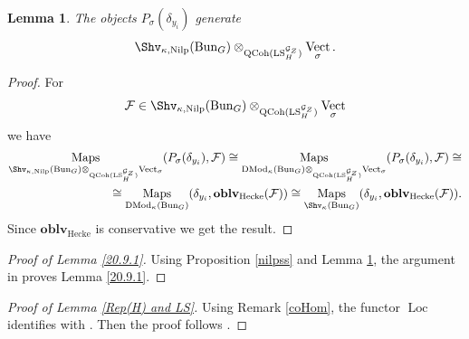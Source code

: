 \documentclass[9pt]{amsart}
\newcommand{\cF}{{\mathcal F}}
\newcommand{\cG}{{\mathcal G}}
\DeclareMathOperator{\QCoh}{{QCoh}}
\DeclareMathOperator{\Maps}{{Maps}}
\DeclareMathOperator{\LocSys}{{LS}}
\DeclareMathOperator{\Loc}{{Loc}}
\DeclareMathOperator{\Nilp}{{Nilp}} \DeclareMathOperator{\op}{{op}}
\DeclareMathOperator{\Vect}{{Vect}}
\newtheorem{lm}[subsubsection]{Lemma}
\numberwithin{equation}{section}
\DeclareMathOperator{\D}{{DMod}}
\begin{document}
\begin{lm}\label{gen}
	The objects $P_{\sigma}(\delta_{y_i})$ generate $$\Shv_{\kappa, \Nilp}(\Bun_G) \otimes_{\QCoh(\LocSys_H^{\cG_Z})} \Vect_{\sigma}.$$
\end{lm}
\begin{proof}
	For $$\cF \in \Shv_{\kappa, \Nilp}(\Bun_G) \otimes_{\QCoh(\LocSys_H^{\cG_Z})} \Vect_{\sigma}$$ we have 
	\begin{equation}
		\begin{split}
		\Maps_{ \Shv_{\kappa, \Nilp}(\Bun_G) \otimes_{\QCoh(\LocSys_H^{\cG_Z})} \Vect_{\sigma}}(P_{\sigma}(\delta_{y_i}), \cF) \cong \Maps_{ \D_{\kappa}(\Bun_G) \otimes_{\QCoh(\LocSys_H^{\cG_Z})} \Vect_{\sigma}}(P_{\sigma}(\delta_{y_i}), \cF) \cong \\
		\cong  \Maps_{\D_{\kappa}(\Bun_G)}(\delta_{y_i}, \mathbf{oblv}_{\operatorname{Hecke}}(\cF)) \cong \Maps_{\Shv_{\kappa}(\Bun_G)}(\delta_{y_i}, \mathbf{oblv}_{\operatorname{Hecke}}(\cF)).
		\end{split}
	\end{equation}
	Since $\mathbf{oblv}_{\operatorname{Hecke}}$ is conservative we get the result.
\end{proof}


\begin{proof}[Proof of Lemma \ref{20.9.1}]
	Using Proposition \ref{nilpss} and Lemma \ref{gen}, the argument in \cite[20.9.4]{AGKRRV} proves Lemma \ref{20.9.1}.
\end{proof}

\begin{proof}[Proof of Lemma \ref{Rep(H) and LS}]
	Using Remark \ref{coHom}, the functor $\Loc$ identifies with \cite[(12.12)]{AGKRRV}. Then the proof follows \cite[Theorem 12.6.3]{AGKRRV}.
\end{proof}





\end{document}
